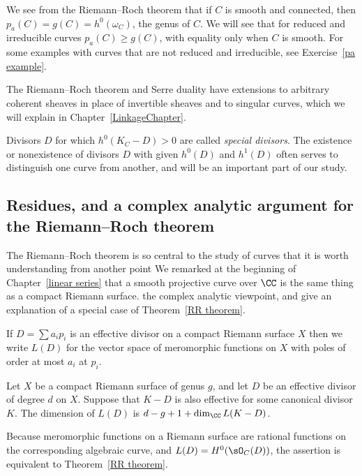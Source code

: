 We see from the Riemann--Roch theorem that if $C$ is smooth and connected, then $p_a(C) = g(C) = h^0(\omega_C)$, the genus of $C$. We
will see that for reduced and irreducible curves $p_a(C) \geq g(C)$, with equality only when $C$ is smooth.
  For some examples with curves that are not
reduced and irreducible, see Exercise~\ref{pa example}.
  

The Riemann--Roch theorem and Serre duality have extensions to arbitrary coherent sheaves in place of invertible sheaves 
and to singular curves, which we will explain in Chapter~\ref{LinkageChapter}.

Divisors $D$ for which $h^0(K_C - D)>0$ are called \emph{special divisors}. The existence or nonexistence of divisors $D$ with given $h^{0}(D)$ and $h^{1}(D)$ often serves to distinguish one curve from another, and will be an important part of our study.

\subsection*{Residues, and a complex analytic argument for 
the Riemann--Roch theorem} 

The 
Rie\-mann--Roch theorem is so central to the study of curves that it is worth understanding from another point
We remarked at the beginning of Chapter~\ref{linear series} that a
smooth projective curve over $\CC$ is the same thing as a compact
Riemann surface. 
the complex analytic viewpoint, and give an explanation of 
%
a special case of Theorem~\ref{RR theorem}.

If $D = \sum a_ip_i$ is an effective divisor 
on a compact Riemann surface $X$ then we write $L(D)$ 
for the vector space of meromorphic functions on $X$ with poles of order 
at most $a_i$ at $p_i$. 

\begin{theorem}
Let $X$ be a compact Riemann surface of genus $g$, and let $D$ be an effective divisor of degree $d$ on $X$. Suppose that $K-D$ is also effective for some canonical divisor $K$.
The dimension of  $L(D)$ is
$d-g+1+\dim_\CC L(K-D)$.
\end{theorem}
Because  meromorphic functions on a Riemann surface are rational functions on the corresponding
algebraic curve, and $L(D) = H^0(\sO_C(D))$, the assertion is equivalent to Theorem~\ref{RR theorem}.

